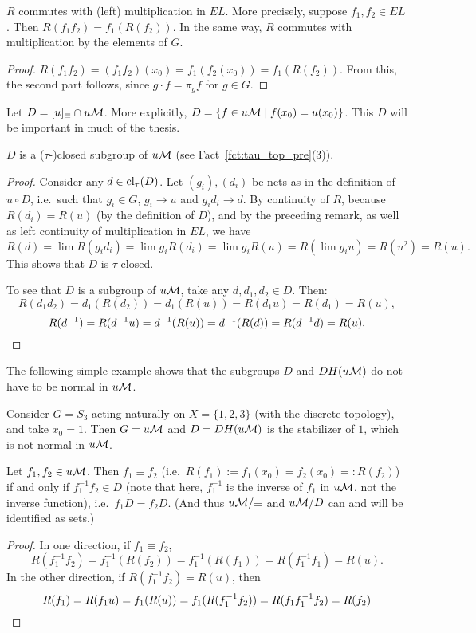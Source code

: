 	\begin{prop}
		\label{prop:commu}
		$R$ commutes with (left) multiplication in $EL$. More precisely, suppose $f_1,f_2\in EL$. Then $R(f_1f_2)=f_1(R(f_2))$. In the same way, $R$ commutes with multiplication by the elements of $G$.
	\end{prop}
	\begin{proof}
		$R(f_1f_2)=(f_1f_2)(x_0)=f_1(f_2(x_0))=f_1(R(f_2))$. From this, the second part follows, since $g\cdot f=\pi_gf$ for $g \in G$.
	\end{proof}
	
	Let $D=[u]_{\equiv}\cap u{\mathcal M}$. More explicitly, $D=\{f\in u{\mathcal M} \mid f(x_0)=u(x_0) \}$. This $D$ will be important in much of the thesis.
	
	\begin{lem}
		\label{lem:D_closed}
		$D$ is a ($\tau$-)closed subgroup of $u{\mathcal M}$ (see Fact~\ref{fct:tau_top_pre}(3)).
	\end{lem}
	\begin{proof} Consider any $d \in \operatorname{{cl}}_\tau(D)$.
		Let $(g_i),(d_i)$ be nets as in the definition of $u\circ D$, i.e.\ such that $g_i\in G$, $g_i\to u$ and $g_id_i\to d$.
		By continuity of $R$, because $R(d_i)=R(u)$ (by the definition of $D$), and by the preceding remark, as well as left continuity of multiplication in $EL$, we have
		\[
		R(d)=\lim R(g_id_i)=\lim g_iR(d_i)=\lim g_iR(u)=R(\lim g_iu)=R(u^2)=R(u).
		\]
		This shows that $D$ is $\tau$-closed.
		
		To see that $D$ is a subgroup of $u{\mathcal M}$, take any $d,d_1,d_2\in D$. Then:
		\[
		R(d_1d_2)=d_1(R(d_2))=d_1(R(u))=R(d_1u)=R(d_1)=R(u),
		\]
		\[
		R(d^{-1})=R(d^{-1}u)=d^{-1}(R(u))=d^{-1}(R(d))=R(d^{-1}d)=R(u).\qedhere
		\]
	\end{proof}
	
	The following simple example shows that the subgroups $D$ and $DH(u{\mathcal M})$ do not have to be normal in $u{\mathcal M}$.
	\begin{ex}
		\label{ex:D_not_normal}
		Consider $G=S_3$ acting naturally on $X=\{1,2,3\}$ (with the discrete topology), and take $x_0=1$. Then $G=u{\mathcal M}$ and $D=DH(u{\mathcal M})$ is the stabilizer of $1$, which is not normal in $u{\mathcal M}$. \xqed{\lozenge}
	\end{ex}
	
	\begin{lem}
		\label{lem:D_kernel_equiv}
		Let $f_1,f_2\in u{\mathcal M}$. Then $f_1\equiv f_2$ (i.e.\ $R(f_1):=f_1(x_0)=f_2(x_0)=:R(f_2)$) if and only if $f_1^{-1}f_2\in D$ (note that here, $f_1^{-1}$ is the inverse of $f_1$ in $u{\mathcal M}$, not the inverse function), i.e.\ $f_1D=f_2D$. (And thus $u{\mathcal M}/{\equiv}$ and $u{\mathcal M}/D$ can and will be identified as sets.)
	\end{lem}
	\begin{proof}
		In one direction, if $f_1\equiv f_2$,
		\[
		R(f_1^{-1}f_2)=f_1^{-1}(R(f_2))=f_1^{-1}(R(f_1))=R(f_1^{-1}f_1)=R(u).
		\]
		In the other direction, if $R(f_1^{-1}f_2)=R(u)$, then
		\[
		R(f_1)=R(f_1u)=f_1(R(u))=f_1(R(f_1^{-1}f_2))=R(f_1f_1^{-1}f_2)=R(f_2)\qedhere
		\]
	\end{proof}
	
